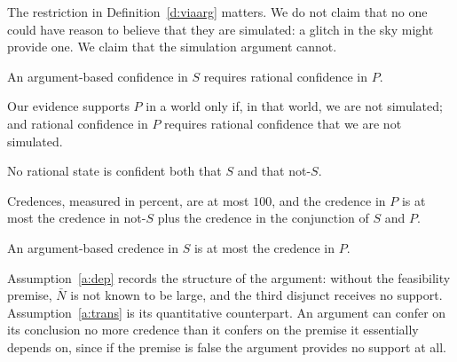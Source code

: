 \documentclass{situationist-preprint}
\begin{document}
The restriction in Definition~\ref{d:viaarg} matters. We do not claim that no one could have reason to believe that they are simulated: a glitch in the sky might provide one. We claim that the simulation argument cannot.

\begin{assumption}[Dependence]\label{a:dep}
An argument-based confidence in $S$ requires rational confidence in $P$.
\end{assumption}

\begin{assumption}\label{a:base}
Our evidence supports $P$ in a world only if, in that world, we are not simulated; and rational confidence in $P$ requires rational confidence that we are not simulated.
\end{assumption}

\begin{assumption}[Coherence]\label{a:coh}
No rational state is confident both that $S$ and that not-$S$.
\end{assumption}

\begin{assumption}[Probability]\label{a:prob}
Credences, measured in percent, are at most $100$, and the credence in $P$ is at most the credence in not-$S$ plus the credence in the conjunction of $S$ and $P$.
\end{assumption}

\begin{assumption}[Transmission]\label{a:trans}
An argument-based credence in $S$ is at most the credence in $P$.
\end{assumption}

Assumption~\ref{a:dep} records the structure of the argument: without the feasibility premise, $\bar N$ is not known to be large, and the third disjunct receives no support. Assumption~\ref{a:trans} is its quantitative counterpart. An argument can confer on its conclusion no more credence than it confers on the premise it essentially depends on, since if the premise is false the argument provides no support at all.
\end{document}
